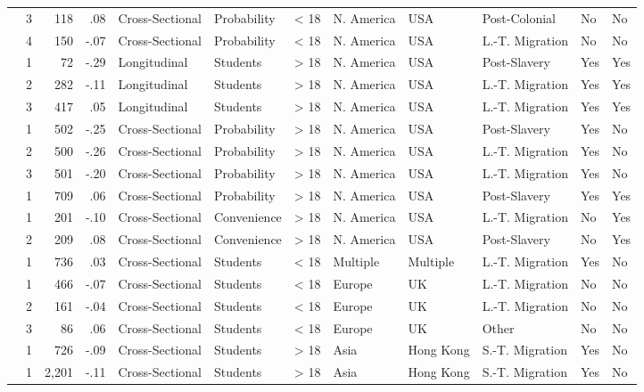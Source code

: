 \documentclass[10pt, letterpaper]{article}
\begin{document}
\begin{landscape}
\begin{xltabular}{650pt}{Xrrrllrlllll}
 & 3 & 118 & .08 & Cross-Sectional & Probability & < 18 & N. America & USA & Post-Colonial & No & No\\
 & 4 & 150 & -.07 & Cross-Sectional & Probability & < 18 & N. America & USA & L.-T. Migration & No & No\\
\cite{1743} & 1 & 72 & -.29 & Longitudinal & Students & > 18 & N. America & USA & Post-Slavery & Yes & Yes\\
 & 2 & 282 & -.11 & Longitudinal & Students & > 18 & N. America & USA & L.-T. Migration & Yes & Yes\\
 & 3 & 417 & .05 & Longitudinal & Students & > 18 & N. America & USA & L.-T. Migration & Yes & Yes\\
\cite{1658} & 1 & 502 & -.25 & Cross-Sectional & Probability & > 18 & N. America & USA & Post-Slavery & Yes & No\\
 & 2 & 500 & -.26 & Cross-Sectional & Probability & > 18 & N. America & USA & L.-T. Migration & Yes & No\\
 & 3 & 501 & -.20 & Cross-Sectional & Probability & > 18 & N. America & USA & L.-T. Migration & Yes & No\\
\cite{933} & 1 & 709 & .06 & Cross-Sectional & Probability & > 18 & N. America & USA & Post-Slavery & Yes & Yes\\
\cite{2394} & 1 & 201 & -.10 & Cross-Sectional & Convenience & > 18 & N. America & USA & L.-T. Migration & No & Yes\\
 & 2 & 209 & .08 & Cross-Sectional & Convenience & > 18 & N. America & USA & Post-Slavery & No & Yes\\
\cite{829} & 1 & 736 & .03 & Cross-Sectional & Students & < 18 & Multiple & Multiple & L.-T. Migration & Yes & No\\
\cite{2383} & 1 & 466 & -.07 & Cross-Sectional & Students & < 18 & Europe & UK & L.-T. Migration & No & No\\
 & 2 & 161 & -.04 & Cross-Sectional & Students & < 18 & Europe & UK & L.-T. Migration & No & No\\
 & 3 & 86 & .06 & Cross-Sectional & Students & < 18 & Europe & UK & Other & No & No\\
\cite{1395} & 1 & 726 & -.09 & Cross-Sectional & Students & > 18 & Asia & Hong Kong & S.-T. Migration & Yes & No\\
\cite{3000} & 1 & 2,201 & -.11 & Cross-Sectional & Students & > 18 & Asia & Hong Kong & S.-T. Migration & Yes & No\\
\end{xltabular}


\end{landscape}
\end{document}
